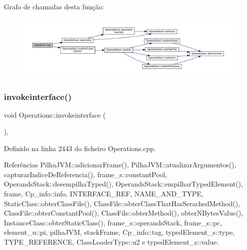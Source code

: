 Grafo de chamadas desta função\+:\nopagebreak
\begin{figure}[H]
\begin{center}
\leavevmode
\includegraphics[width=350pt]{classOperations_a819d5dd66c64a6801a1599b5abf81ae7_cgraph}
\end{center}
\end{figure}
\mbox{\label{classOperations_a9206595fad5d3ac24514b2dfd6a013da}} 
\subsubsection{\texorpdfstring{invokeinterface()}{invokeinterface()}}
{\footnotesize\ttfamily void Operations\+::invokeinterface (\begin{DoxyParamCaption}{ }\end{DoxyParamCaption})\hspace{0.3cm}{\ttfamily [static]}, {\ttfamily [private]}}



Definido na linha 2443 do ficheiro Operations.\+cpp.



Referências Pilha\+J\+V\+M\+::adicionar\+Frame(), Pilha\+J\+V\+M\+::atualizar\+Argumentos(), capturar\+Indice\+De\+Referencia(), frame\+\_\+s\+::constant\+Pool, Operands\+Stack\+::desempilha\+Typed(), Operands\+Stack\+::empilhar\+Typed\+Element(), frame, Cp\+\_\+info\+::info, I\+N\+T\+E\+R\+F\+A\+C\+E\+\_\+\+R\+EF, N\+A\+M\+E\+\_\+\+A\+N\+D\+\_\+\+T\+Y\+PE, Static\+Class\+::obter\+Class\+File(), Class\+File\+::obter\+Class\+That\+Has\+Serached\+Method(), Class\+File\+::obter\+Constant\+Pool(), Class\+File\+::obter\+Method(), obter\+N\+Bytes\+Value(), Instance\+Class\+::obter\+Static\+Class(), frame\+\_\+s\+::operands\+Stack, frame\+\_\+s\+::pc, element\+\_\+u\+::pi, pilha\+J\+VM, stack\+Frame, Cp\+\_\+info\+::tag, typed\+Element\+\_\+s\+::type, T\+Y\+P\+E\+\_\+\+R\+E\+F\+E\+R\+E\+N\+CE, Class\+Loader\+Type\+::u2 e typed\+Element\+\_\+s\+::value.

